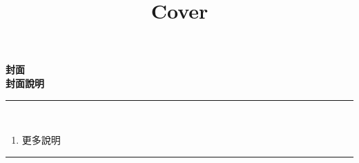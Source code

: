 \documentclass[a4paper]{article}
\title{Cover}
\begin{document}
\begin{center}
\textbf{\huge 封面}\\
\vspace{5mm}
\textbf{\huge 封面說明}\\

\vspace{10mm}
\rule{17cm}{1pt}\\
\vspace{5mm}
\end{center}

\fontsize{14pt}{20pt}\selectfont

\begin{enumerate}
    \setlength\itemsep{0.5pt}
    \item 更多說明
\end{enumerate}

\begin{center}
\rule{17cm}{2pt}\\
\end{center}
\end{document}
